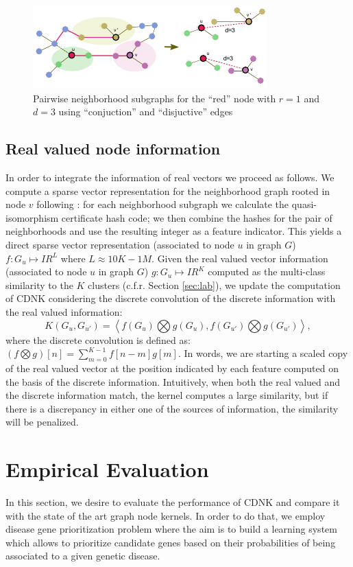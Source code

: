 \documentclass[review]{elsarticle}
\begin{document}
\begin{figure}
\centering
\includegraphics[width=.9\textwidth]{cdnk}
\caption{Pairwise neighborhood subgraphs for the ``red'' node with $r=1$ and $d=3$ using ``conjuction'' and ``disjuctive'' edges}
\label{fig:cdnk}
\end{figure}

\subsection{Real valued node information}
In order to integrate the information of real vectors we proceed as follows. We compute a sparse vector representation for the neighborhood graph rooted in node $v$ following \cite{costa2010fast}: for each neighborhood subgraph we calculate the quasi-isomorphism certificate hash code; we then combine the hashes for the pair of neighborhoods and use the resulting integer as a feature indicator. This yields a direct sparse vector representation (associated to node $u$ in graph $G$) $f: G_u \longmapsto I\!R^L$ where $L \approx 10K-1M$. Given the real valued vector information (associated to node $u$ in graph $G$) $g: G_u \longmapsto I\!R^K$ computed as the multi-class similarity to the $K$ clusters (c.f.r. Section \ref{sec:lab}), we update the computation of CDNK considering the discrete convolution of the discrete information with the real valued information:   
\begin{equation}
K(G_u,G_{u'}) = \left< f(G_u) \bigotimes g(G_u), f(G_{u'}) \bigotimes g(G_{u'}) \right>,
\end{equation}
where the discrete convolution is defined as: 
$(f \bigotimes g)[n]=\sum _{m=0}^{K-1}f[n-m]g[m].$
In words, we are starting a scaled copy of the real valued vector at the position indicated by each feature computed on the basis of the discrete information. Intuitively, when both the real valued and the discrete information match, the kernel computes a large similarity, but if there is a discrepancy in either one of the sources of information, the similarity will be penalized. 

\section{Empirical Evaluation}
In this section, we desire to evaluate the performance of CDNK and compare it with the state of the art graph node kernels. In order to do that, we employ disease gene prioritization problem where the aim is to build a learning system which allows to prioritize candidate genes based on their probabilities of being associated to a given genetic disease.
\end{document}
